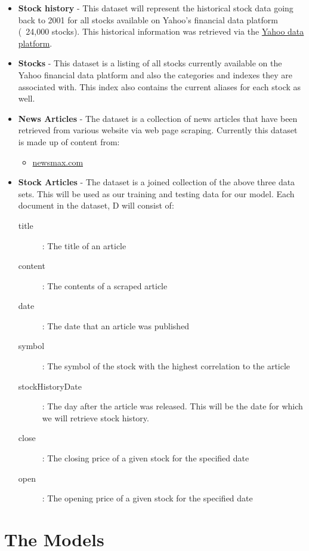 \documentclass[11pt,letterpaper]{article}
\begin{document}
  \begin{itemize}
  	\item \textbf{Stock history}
		- This dataset will represent the historical stock data going back to 2001 for all stocks available on Yahoo's financial data platform (~24,000 stocks). This historical information was retrieved via the  \href{https://developer.yahoo.com/yql}{Yahoo data platform}.
	\item \textbf{Stocks}
		- This dataset is a listing of all stocks currently available on the Yahoo financial data platform and also the categories and indexes they are associated with.  This index also contains the current aliases for each stock as well.
	\item \textbf{News Articles}
		- The dataset is a collection of news articles that have been retrieved from various website via web page scraping.  Currently this dataset is made up of content from:
		\begin{itemize}
			\item \href{http://www.newsmax.com/archives/}{newsmax.com}
		\end{itemize}
	\item \textbf{Stock Articles}
		- The dataset is a joined collection of the above three data sets.  This will be used as our training and testing data for our model. Each document in the dataset, D will consist of:
		\begin{description}
			\item[title] : The title of an article
			\item[content] : The contents of a scraped article
			\item[date] : The date that an article was published
			\item[symbol] : The symbol of the stock with the highest correlation to the article
			\item[stockHistoryDate] : The day after the article was released.  This will be the date for which we will retrieve stock history.
			\item[close] : The closing price of a given stock for the specified date
			\item[open] : The opening price of a given stock for the specified date
		\end{description}
  \end{itemize}

\section{The Models}
\label{sec:models}
\end{document}
